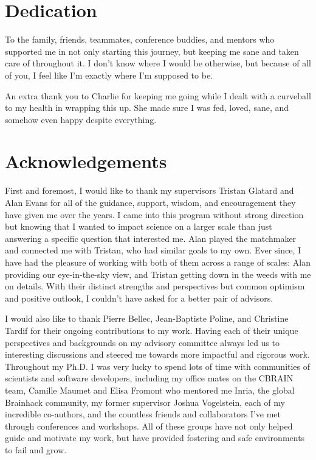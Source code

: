 \documentclass[fleqn,12pt]{SelfArx} %
\affiliation{\textit{Biological \& Biomedical Engineering, McGill University, Montréal, QC, Canada}}
\begin{document}
\flushbottom %
\makethesistitle %
\onecolumn

\beginfront
\clearpage
{}
\section{Dedication}
To the family, friends, teammates, conference buddies, and mentors who supported me in not only starting this journey,
but keeping me sane and taken care of throughout it. I don't know where I would be otherwise, but because of all of
you, I feel like I'm exactly where I'm supposed to be.

An extra thank you to Charlie for keeping me going while I dealt with a curveball to my health in wrapping this up. She
made sure I was fed, loved, sane, and somehow even happy despite everything.
\clearpage

\section{Acknowledgements}
First and foremost, I would like to thank my supervisors Tristan Glatard and Alan Evans for all of the guidance,
support, wisdom, and encouragement they have given me over the years. I came into this program without strong direction
but knowing that I wanted to impact science on a larger scale than just answering a specific question that interested
me. Alan played the matchmaker and connected me with Tristan, who had similar goals to my own. Ever since, I have had
the pleasure of working with both of them across a range of scales: Alan providing our eye-in-the-sky view, and Tristan
getting down in the weeds with me on details. With their distinct strengths and perspectives but common optimism and
positive outlook, I couldn't have asked for a better pair of advisors.

I would also like to thank Pierre Bellec, Jean-Baptiste Poline, and Christine Tardif for their ongoing contributions to
my work. Having each of their unique perspectives and backgrounds on my advisory committee always led us to interesting
discussions and steered me towards more impactful and rigorous work. Throughout my Ph.D. I was very lucky to spend lots
of time with communities of scientists and software developers, including my office mates on the CBRAIN team, Camille
Maumet and Elisa Fromont who mentored me Inria, the global Brainhack community, my former supervisor Joshua Vogelstein,
each of my incredible co-authors, and the countless friends and collaborators I've met through conferences and
workshops. All of these groups have not only helped guide and motivate my work, but have provided fostering and safe
environments to fail and grow.
\end{document}
